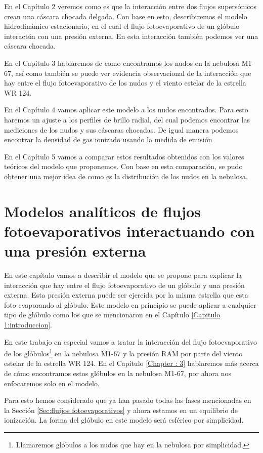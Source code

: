 \documentclass{book}
\begin{document}
En el Capítulo 2 veremos como es que la interacción entre dos flujos
supersónicos crean una cáscara chocada delgada. Con base en esto,
describiremos el modelo hidrodinámico estacionario, en el cual el
flujo fotoevaporativo de un glóbulo interactúa con una presión
externa. En esta interacción también podemos ver una cáscara chocada.

En el Capítulo 3 hablaremos de como encontramos los nudos en la
nebulosa M1-67, así como también se puede ver evidencia observacional
de la interacción que hay entre el flujo fotoevaporativo de los nudos
y el viento estelar de la estrella WR 124.

En el Capítulo 4 vamos aplicar este modelo a los nudos encontrados.
Para esto haremos un ajuste a los perfiles de brillo radial, del cual
podemos encontrar las mediciones de los nudos y sus cáscaras chocadas.
De igual manera podemos encontrar la densidad de gas ionizado usando
la medida de emisión

En el Capítulo 5 vamos a comparar estos resultados obtenidos con los
valores teóricos del modelo que proponemos. Con base en esta
comparación, se pudo obtener una mejor idea de como es la distribución
de los nudos en la nebulosa.

\chapter{Modelos analíticos de flujos fotoevaporativos interactuando
  con una presión externa}
\label{Chapter : Modelo}

En este capítulo vamos a describir el modelo que se propone para
explicar la interacción que hay entre el flujo fotoevaporativo de un
glóbulo y una presión externa. Esta presión externa puede ser ejercida
por la misma estrella que esta foto evaporando al glóbulo. Este modelo
en principio se puede aplicar a cualquier tipo de glóbulo como los que
se mencionaron en el Capítulo \ref{Capitulo 1:introduccion}.

En este trabajo en especial vamos a tratar la interacción del flujo
fotoevaporativo de los glóbulos\footnote{Llamaremos glóbulos a los
nudos que hay en la nebulosa por simplicidad.} en la nebulosa M1-67 y
la presión RAM por parte del viento estelar de la estrella WR 124. En
el Capítulo \ref{Chapter : 3} hablaremos más acerca de cómo
encontramos estos glóbulos en la nebulosa M1-67, por ahora nos
enfocaremos solo en el modelo.

Para esto hemos considerado que ya han pasado todas las fases
mencionadas en la Sección \ref{Sec:fluijos fotoevaporativos} y ahora
estamos en un equilibrio de ionización. La forma del glóbulo en este
modelo será esférico por simplicidad.
\end{document}

